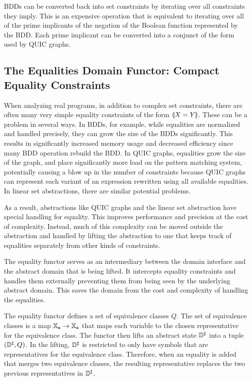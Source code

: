 BDDs can be converted back into set constraints by iterating over all constraints they imply.  This is an expensive operation that is equivalent to iterating over all of the prime implicants of the negation of the Boolean function represented by the BDD.  Each prime implicant can be converted into a conjunct of the form used by QUIC graphs.

\subsection{The Equalities Domain Functor: Compact Equality Constraints}
\label{s:4:4:eqs}
\newcommand{\eqrep}{\ensuremath{Q}}

When analyzing real programs, in addition to complex set constraints, there are often many very simple equality constraints of the form $\llparenthesis X = Y \rrparenthesis$.  These can be a problem in several ways.  In BDDs, for example, while equalities are normalized and handled precisely, they can grow the size of the BDDs significantly.  This results in significantly increased memory usage and decreased efficiency since many BDD operation rebuild the BDD.  In QUIC graphs, equalities grow the size of the graph, and place significantly more load on the pattern matching system, potentially causing a blow up in the number of constraints because QUIC graphs can represent each variant of an expression rewritten using all available equalities.  In linear set abstractions, there are similar potential problems.

As a result, abstractions like QUIC graphs and the linear set abstraction have special handling for equality.  This improves performance and precision at the cost of complexity.  Instead, much of this complexity can be moved outside the abstraction and handled by lifting the abstraction to one that keeps track of equalities separately from other kinds of constraints.

The equality functor serves as an intermediary between the domain interface and the abstract domain that is being lifted.  It intercepts equality constraints and handles them externally preventing them from being seen by the underlying abstract domain.  This saves the domain from the cost and complexity of handling the equalities.

The equality functor defines a set of equivalence classes $\eqrep$.  The set of equivalence classes is a map $\mathbb{X}_{\bf s} \rightarrow \mathbb{X}_{\bf s}$ that maps each variable to the chosen representative for the equivalence class.  The functor then lifts an abstract state ${\mathbb{D}}^{\sharp}$ into a tuple $(\adom, \eqrep)$.  In the lifting, ${\mathbb{D}}^{\sharp}$ is restricted to only have symbols that are representatives for the equivalence class.  Therefore, when an equality is added that merges two equivalence classes, the resulting representative replaces the two previous representatives in ${\mathbb{D}}^{\sharp}$.

